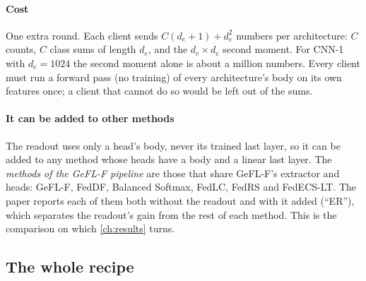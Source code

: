 \paragraph{Cost} One extra round. Each client sends $C(d_e+1)+d_e^2$ numbers per architecture: $C$ counts, $C$
class sums of length $d_e$, and the $d_e\times d_e$ second moment. For CNN-1 with $d_e=1024$ the second moment alone is
about a million numbers. Every client must run a forward pass (no training) of every architecture's body on its own
features once; a client that cannot do so would be left out of the sums.

\paragraph{It can be added to other methods} The readout uses only a head's body, never its trained last layer, so it
can be added to any method whose heads have a body and a linear last layer. The \emph{methods of the GeFL-F pipeline}
are those that share GeFL-F's extractor and heads: GeFL-F, FedDF, Balanced Softmax, FedLC, FedRS and FedECS-LT. The
paper reports each of them both without the readout and with it added (``ER''), which separates the readout's gain from
the rest of each method. This is the comparison on which \cref{ch:results} turns.

\subsection{The whole recipe}\label{sec:s-recipe}

